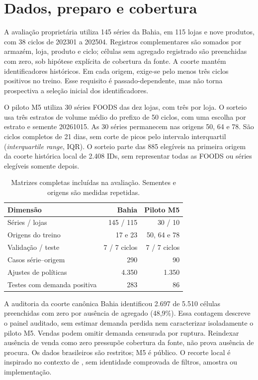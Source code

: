 \section{Dados, preparo e cobertura}
\label{sec:pipeline_experimental}\label{sec:ba2026_methods}
A avaliação proprietária utiliza 145 séries da Bahia, em 115 lojas e nove produtos, com 38 ciclos de 202301 a 202504. Registros complementares são somados por armazém, loja, produto e ciclo; células sem agregado registrado são preenchidas com zero, sob hipótese explícita de cobertura da fonte. A coorte mantém identificadores históricos. Em cada origem, exige-se pelo menos três ciclos positivos no treino. Esse requisito é passado-dependente, mas não torna prospectiva a seleção inicial dos identificadores.

O piloto M5 utiliza 30 séries FOODS das dez lojas, com três por loja. O sorteio usa três estratos de volume médio do prefixo de 50 ciclos, com uma escolha por estrato e semente 20261015. As 30 séries permanecem nas origens 50, 64 e 78. São ciclos completos de 21 dias, sem corte de picos pelo intervalo interquartil (\textit{interquartile range}, IQR). O sorteio parte das 885 elegíveis na primeira origem da coorte histórica local de 2.408 IDs, sem representar todas as FOODS ou séries elegíveis somente depois.

\begin{table}[htbp]\centering\small
\caption{Matrizes completas incluídas na avaliação. Sementes e origens são medidas repetidas.}\label{tab:temporal_coverage}
\begin{tabular}{@{}lrr@{}}\toprule
Dimensão & Bahia & Piloto M5\\\midrule
Séries / lojas & 145 / 115 & 30 / 10\\
Origens do treino & 17 e 23 & 50, 64 e 78\\
Validação / teste & 7 / 7 ciclos & 7 / 7 ciclos\\
Casos série--origem & 290 & 90\\
Ajustes de políticas & 4.350 & 1.350\\
Testes com demanda positiva & 283 & 86\\\bottomrule
\end{tabular}\end{table}

A auditoria da coorte canônica Bahia identificou 2.697 de 5.510 células preenchidas com zero por ausência de agregado (48,9\%). Essa contagem descreve o painel auditado, sem estimar demanda perdida nem caracterizar isoladamente o piloto M5. Vendas podem omitir demanda censurada por ruptura. Reindexar ausência de venda como zero pressupõe cobertura da fonte, não prova ausência de procura. Os dados brasileiros são restritos; M5 é público. O recorte local é inspirado no contexto de \citet{Zabraoui2025GaDQN}, sem identidade comprovada de filtros, amostra ou implementação.

